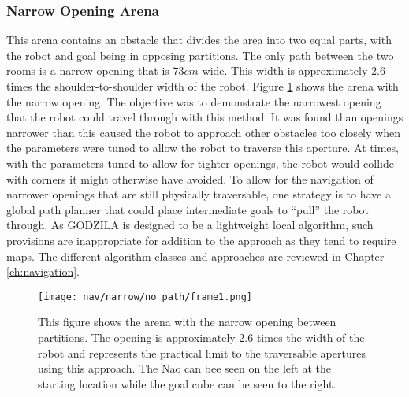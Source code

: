 \subsubsection{Narrow Opening Arena}
This arena contains an obstacle that divides the area into two equal
parts, with the robot and goal being in opposing partitions. The only path between
the two rooms is a narrow opening that is $73 cm$ wide. This width is approximately
2.6 times the shoulder-to-shoulder width of the robot. 
Figure \ref{fig:nav_narrow_setup1} shows the arena with the narrow opening.
The objective was to demonstrate the narrowest opening that the robot could travel through with this method.
It was found than openings narrower than this caused the robot to approach other obstacles too 
closely when the parameters were tuned to allow the robot to traverse this aperture.
At times, with the parameters tuned to allow for tighter openings, the robot would
collide with corners it might otherwise have avoided.
To allow for the navigation of narrower openings that are still physically traversable,
one strategy is to have a global path planner that could place intermediate goals
to ``pull'' the robot through. As GODZILA is designed to be a lightweight local algorithm,
such provisions are inappropriate for addition to the approach as they tend to require maps.
The different algorithm classes and approaches are reviewed in Chapter \ref{ch:navigation}.


\begin{figure}
  \texttt{[image: nav/narrow/no\_path/frame1.png]}
  \caption{This figure shows the arena with the narrow opening between partitions.
           The opening is approximately 2.6 times the width of the robot and represents
           the practical limit to the traversable apertures using this approach.
           The Nao can bee seen on the left at the starting location
           while the goal cube can be seen to the right.}
  \label{fig:nav_narrow_setup1}
\end{figure}


